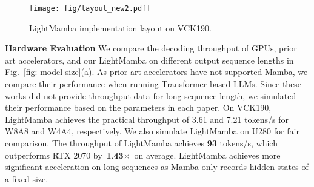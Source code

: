 \begin{figure}[t]
    \centering    
    \texttt{[image: fig/layout\_new2.pdf]}
    \caption{LightMamba implementation layout on VCK190.}
    \vspace{-10pt}
    \label{fig:FPGA_layout}
\end{figure}

\textbf{Hardware Evaluation}
We compare the decoding throughput of GPUs, prior art accelerators, and our LightMamba on different output sequence lengths in Fig.~\ref{fig: model size}(a). 
As prior art accelerators have not supported Mamba,
we compare their performance when running Transformer-based LLMs.
Since these works did not provide throughput data for long sequence length,
we simulated their performance based on the parameters in each paper.
On VCK190, LightMamba achieves the practical throughput of 3.61 and 7.21 tokens/s for
W8A8 and W4A4, respectively.
We also simulate LightMamba on U280 for fair comparison. 
The throughput of LightMamba achieves \textbf{93} tokens/s, which outperforms RTX 2070 by $\textbf{1.43}\times$ on average. LightMamba achieves more significant acceleration on long sequences as Mamba only records hidden states of a fixed size.

